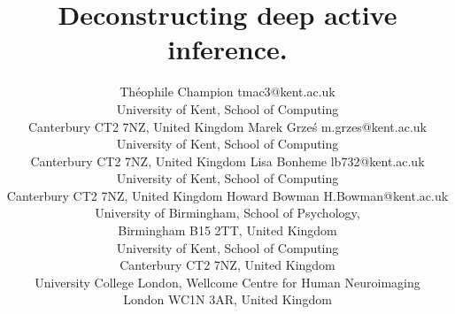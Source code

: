 \documentclass[twoside,11pt]{article}
\begin{document}
\title{Deconstructing deep active inference.}

\author{\name Théophile Champion \email tmac3@kent.ac.uk \\
       \addr University of Kent, School of Computing\\
       Canterbury CT2 7NZ, United Kingdom
       \AND
       \name Marek Grze\'s \email m.grzes@kent.ac.uk \\
       \addr University of Kent, School of Computing\\
       Canterbury CT2 7NZ, United Kingdom
       \AND
       \name Lisa Bonheme \email lb732@kent.ac.uk \\
       \addr University of Kent, School of Computing\\
       Canterbury CT2 7NZ, United Kingdom
       \AND
       \name Howard Bowman \email H.Bowman@kent.ac.uk \\
       \addr University of Birmingham, School of Psychology,\\
       Birmingham B15 2TT, United Kingdom\\
       University of Kent, School of Computing\\
       Canterbury CT2 7NZ, United Kingdom\\
       University College London, Wellcome Centre for Human Neuroimaging\\
       London WC1N 3AR, United Kingdom
       }


\maketitle
\end{document}
